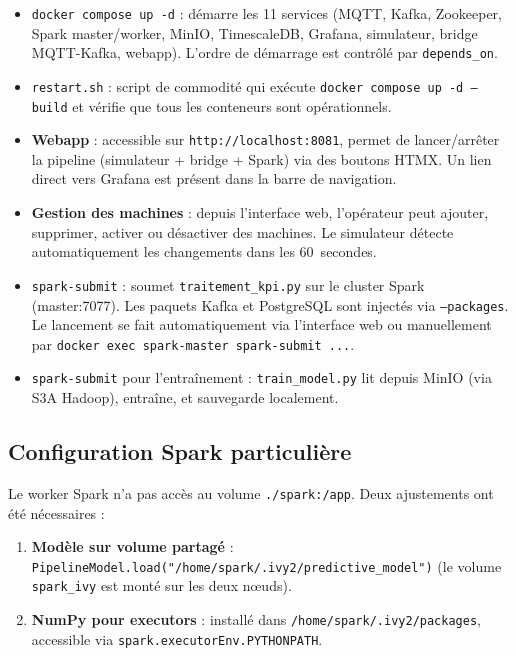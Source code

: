 \documentclass[12pt,a4paper]{article}
\begin{document}
\begin{itemize}
    \item \texttt{docker compose up -d} : démarre les 11 services (MQTT, Kafka, Zookeeper, Spark master/worker, MinIO, TimescaleDB, Grafana, simulateur, bridge MQTT-Kafka, webapp). L'ordre de démarrage est contrôlé par \texttt{depends\_on}.
    \item \texttt{restart.sh} : script de commodité qui exécute \texttt{docker compose up -d --build} et vérifie que tous les conteneurs sont opérationnels.
    \item \textbf{Webapp} : accessible sur \texttt{http://localhost:8081}, permet de lancer/arrêter la pipeline (simulateur + bridge + Spark) via des boutons HTMX. Un lien direct vers Grafana est présent dans la barre de navigation.
    \item \textbf{Gestion des machines} : depuis l'interface web, l'opérateur peut ajouter, supprimer, activer ou désactiver des machines. Le simulateur détecte automatiquement les changements dans les 60~secondes.
    \item \texttt{spark-submit} : soumet \texttt{traitement\_kpi.py} sur le cluster Spark (master:7077). Les paquets Kafka et PostgreSQL sont injectés via \texttt{--packages}. Le lancement se fait automatiquement via l'interface web ou manuellement par \texttt{docker exec spark-master spark-submit ...}.
    \item \texttt{spark-submit} pour l'entraînement : \texttt{train\_model.py} lit depuis MinIO (via S3A Hadoop), entraîne, et sauvegarde localement.
\end{itemize}

\subsection{Configuration Spark particulière}

Le worker Spark n'a pas accès au volume \texttt{./spark:/app}. Deux ajustements ont été nécessaires :

\begin{enumerate}
    \item \textbf{Modèle sur volume partagé} : \texttt{PipelineModel.load("/home/spark/.ivy2/predictive\_model")} (le volume \texttt{spark\_ivy} est monté sur les deux nœuds).
    \item \textbf{NumPy pour executors} : installé dans \texttt{/home/spark/.ivy2/packages}, accessible via \texttt{spark.executorEnv.PYTHONPATH}.
\end{enumerate}
\end{document}
